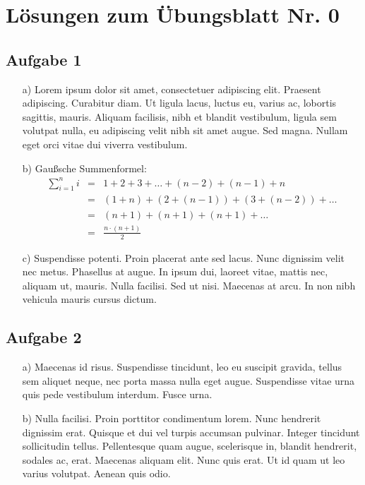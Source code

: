 \documentclass{scrartcl}
\begin{document}
\section*{Lösungen zum Übungsblatt Nr. 0}

\subsection*{Aufgabe 1}
\begin{itemize}
\item[a)] Lorem ipsum dolor sit amet, consectetuer adipiscing elit. Praesent adipiscing. Curabitur diam. Ut ligula lacus, luctus eu, varius ac, lobortis sagittis, mauris. Aliquam facilisis, nibh et blandit vestibulum, ligula sem volutpat nulla, eu adipiscing velit nibh sit amet augue. Sed magna. Nullam eget orci vitae dui viverra vestibulum.

\item[b)] Gaußsche Summenformel:
  \begin{eqnarray}
    \sum_{i=1}^{n}{i} & = & 1 + 2 + 3 + \ldots + (n-2) + (n-1) + n \\
                      & = & (1 + n) + (2 + (n-1)) + (3 + (n-2) ) + \ldots \\
                      & = & (n + 1) + (n + 1) + (n + 1) + \ldots \\
                      & = & \frac{n \cdot (n+1)}{2}
  \end{eqnarray}

\item[c)] Suspendisse potenti. Proin placerat ante sed lacus. Nunc dignissim velit nec metus. Phasellus at augue. In ipsum dui, laoreet vitae, mattis nec, aliquam ut, mauris. Nulla facilisi. Sed ut nisi. Maecenas at arcu. In non nibh vehicula mauris cursus dictum.
\end{itemize}

\subsection*{Aufgabe 2}
\begin{itemize}
\item[a)] Maecenas id risus. Suspendisse tincidunt, leo eu suscipit gravida, tellus sem aliquet neque, nec porta massa nulla eget augue. Suspendisse vitae urna quis pede vestibulum interdum. Fusce urna.
\item[b)] Nulla facilisi. Proin porttitor condimentum lorem. Nunc hendrerit dignissim erat. Quisque et dui vel turpis accumsan pulvinar. Integer tincidunt sollicitudin tellus. Pellentesque quam augue, scelerisque in, blandit hendrerit, sodales ac, erat. Maecenas aliquam elit. Nunc quis erat. Ut id quam ut leo varius volutpat. Aenean quis odio.
\end{itemize}
\end{document}
